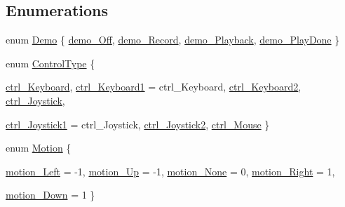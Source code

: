 \subsection*{Enumerations}
\begin{DoxyCompactItemize}
\item 
enum \hyperlink{ID__IN_8H_aee6aa8565f29397f3cdc22bf15ba6763}{Demo} \{ \hyperlink{ID__IN_8H_aee6aa8565f29397f3cdc22bf15ba6763a33868868f757093b473da2b9472f75b7}{demo\_\-Off}, 
\hyperlink{ID__IN_8H_aee6aa8565f29397f3cdc22bf15ba6763ab8c258a346905112a50edaeacbd25401}{demo\_\-Record}, 
\hyperlink{ID__IN_8H_aee6aa8565f29397f3cdc22bf15ba6763ae48ed66d8035f7de561108fc995d2dd7}{demo\_\-Playback}, 
\hyperlink{ID__IN_8H_aee6aa8565f29397f3cdc22bf15ba6763a8ab547b50354308aeac210ca8fecd388}{demo\_\-PlayDone}
 \}
\item 
enum \hyperlink{ID__IN_8H_a8005f1f182fd0248a710ca64f72508d4}{ControlType} \{ \par
\hyperlink{ID__IN_8H_a8005f1f182fd0248a710ca64f72508d4a4ce00b3f21d95d49eba5f6137ab093f1}{ctrl\_\-Keyboard}, 
\hyperlink{ID__IN_8H_a8005f1f182fd0248a710ca64f72508d4a4efed8eec2386a8e7b8ab602a8d8e395}{ctrl\_\-Keyboard1} =  ctrl\_\-Keyboard, 
\hyperlink{ID__IN_8H_a8005f1f182fd0248a710ca64f72508d4a63749704cb81bb1c7d3cabc33263bd69}{ctrl\_\-Keyboard2}, 
\hyperlink{ID__IN_8H_a8005f1f182fd0248a710ca64f72508d4ada84bc48f9403d84b99ddf0c65088d1c}{ctrl\_\-Joystick}, 
\par
\hyperlink{ID__IN_8H_a8005f1f182fd0248a710ca64f72508d4ae8889b658a4cd38d98ddcd5412393ee7}{ctrl\_\-Joystick1} =  ctrl\_\-Joystick, 
\hyperlink{ID__IN_8H_a8005f1f182fd0248a710ca64f72508d4a4462fe4a7d3a42afef571377721584c9}{ctrl\_\-Joystick2}, 
\hyperlink{ID__IN_8H_a8005f1f182fd0248a710ca64f72508d4a1c0bd3d324b0cc0f509a2e0da76dcd4f}{ctrl\_\-Mouse}
 \}
\item 
enum \hyperlink{ID__IN_8H_a099c889d2b948b264c7a665b66e3a9b6}{Motion} \{ \par
\hyperlink{ID__IN_8H_a099c889d2b948b264c7a665b66e3a9b6a9bc2a699c2be52a362f34d2fcc79455b}{motion\_\-Left} =  -\/1, 
\hyperlink{ID__IN_8H_a099c889d2b948b264c7a665b66e3a9b6abd2b9c9822b53de5a5067f90622c1854}{motion\_\-Up} =  -\/1, 
\hyperlink{ID__IN_8H_a099c889d2b948b264c7a665b66e3a9b6afc6e40c5d456de76089cbda98167bd78}{motion\_\-None} =  0, 
\hyperlink{ID__IN_8H_a099c889d2b948b264c7a665b66e3a9b6a379dc3d7c1df68c3a4255424780fbcd2}{motion\_\-Right} =  1, 
\par
\hyperlink{ID__IN_8H_a099c889d2b948b264c7a665b66e3a9b6a2342cac7c38e7a18a963891b52e3e877}{motion\_\-Down} =  1
 \}
\item 

\end{DoxyCompactItemize}

